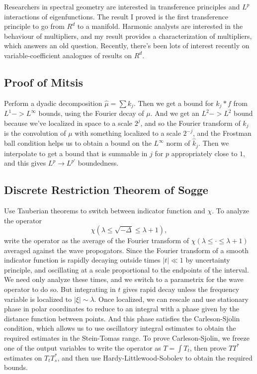 \documentclass[11pt]{article}
\begin{document}
Researchers in spectral geometry are interested in transference principles and $L^p$ interactions of eigenfunctions. The result I proved is the first transference principle to go from $R^d$ to a manifold. Harmonic analysts are interested in the behaviour of multipliers, and my result provides a characterization of multipliers, which answers an old question. Recently, there's been lots of interest recently on variable-coefficient analogues of results on $R^d$.

\subsection{Proof of Mitsis}

Perform a dyadic decomposition $\widehat{\mu} = \sum k_j$. Then we get a bound for $k_j * f$ from $L^1 -> L^\infty$ bounds, using the Fourier decay of $\mu$. And we get an $L^2 -> L^2$ bound because we've localized in space to a scale $2^j$, and so the Fourier transform of $k_j$ is the convolution of $\mu$ with something localized to a scale $2^{-j}$, and the Frostman ball condition helps us to obtain a bound on the $L^\infty$ norm of $\widehat{k}_j$. Then we interpolate to get a bound that is summable in $j$ for $p$ appropriately close to $1$, and this gives $L^p \to L^{p'}$ boundedness.

\subsection{Discrete Restriction Theorem of Sogge}

Use Tauberian theorems to switch between indicator function and $\chi$. To analyze the operator
%
\[ \chi(\lambda \leq \sqrt{-\Delta} \leq \lambda + 1), \]
%
write the operator as the average of the Fourier transform of $\chi(\lambda \leq \cdot \leq \lambda + 1)$ averaged against the wave propogators. Since the Fourier transform of a smooth indicator function is rapidly decaying outside times $|t| \ll 1$ by uncertainty principle, and oscillating at a scale proportional to the endpoints of the interval. We need only analyze these times, and we switch to a parametrix for the wave operator to do so. But integrating in $t$ gives rapid decay unless the frequency variable is localized to $|\xi| \sim \lambda$. Once localized, we can rescale and use stationary phase in polar coordinates to reduce to an integral with a phase given by the distance function between points. And this phase satisfies the Carleson-Sjolin condition, which allows us to use oscillatory integral estimates to obtain the required estimates in the Stein-Tomas range. To prove Carleson-Sjolin, we freeze one of the output variables to write the operator as $T = \int T_t$, then prove $TT^*$ estimates on $T_t T_s^*$, and then use Hardy-Littlewood-Sobolev to obtain the required bounds.
\end{document}

